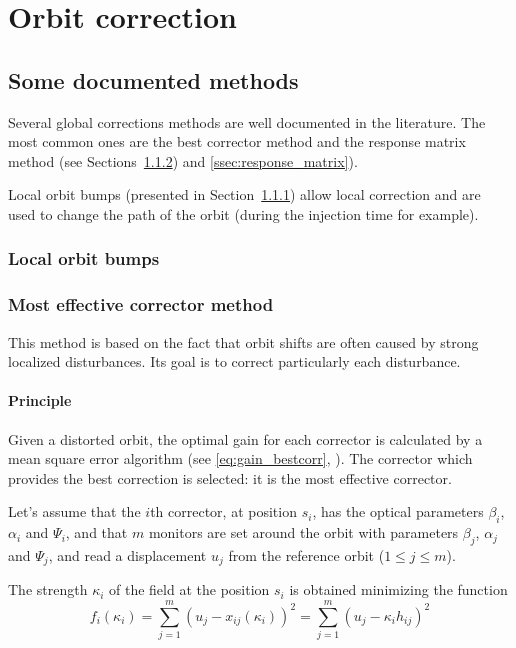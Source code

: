 
\chapter{Orbit correction}
\label{sec:correction}
\section{Some documented methods}

Several global corrections methods are well documented in the literature. The most common ones are the best corrector method and the response matrix method (see Sections~\ref{ssec:most_effective_corr}) and \ref{ssec:response_matrix}). 

Local orbit bumps (presented in Section~\ref{ssec:orbit_bump}) allow local correction and are used to change the path of the orbit (during the injection time for example).

\subsection{Local orbit bumps}
\label{ssec:orbit_bump}

\subsection{Most effective corrector method}
\label{ssec:most_effective_corr}
This method is based on the fact that orbit shifts are often caused by strong localized disturbances. Its goal is to correct particularly each disturbance.

\subsubsection{Principle}

Given a distorted orbit, the optimal gain for each corrector is calculated by a mean square error algorithm (see \eqref{eq:gain_bestcorr}, \cite{book:wille}). The corrector which provides the best correction is selected: it is the most effective corrector.

Let's assume that the $i$th corrector, at position $s_i$, has the optical parameters $\beta_i$, $\alpha_i$ and $\Psi_i$, and that $m$ monitors are set around the orbit with parameters $\beta_j$, $\alpha_j$ and $\Psi_j$, and read a displacement $u_j$ from the reference orbit ($1 \leq j \leq m$).

The strength $\kappa_i$ of the field at the position $s_i$ is obtained minimizing the function
\begin{equation}
    \label{eq:gain_bestcorr}
    f_i(\kappa_i) = \sum\limits_{j=1}^{m} (u_j-x_{ij}(\kappa_i))^2 
                  = \sum\limits_{j=1}^{m} (u_j- \kappa_i h_{ij})^2
\end{equation}

